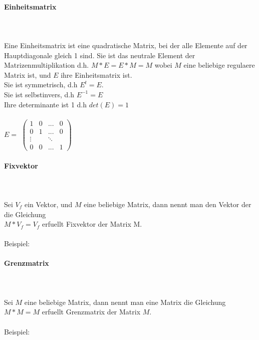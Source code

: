 \documentclass[a4paper]{article} %
\begin{document}
	\paragraph{Einheitsmatrix} 
	 \hspace{0 cm} \\ \noindent \\ Eine Einheitsmatrix ist eine quadratische Matrix, bei der alle Elemente auf der Hauptdiagonale gleich 1 sind.
	Sie ist das neutrale Element der Matrizenmultiplikation d.h. $M*E = E*M = M$ wobei $M$ eine beliebige regulaere Matrix ist, und $E$ ihre Einheitsmatrix ist.\\
	Sie ist symmetrisch, d.h $E^{t}=E$.\\
	Sie ist selbstinvers, d.h $E^{-1}=E$\\
	Ihre determinante ist 1 d.h $det(E)=1$\\\\
	$E =$
		$
		\begin{pmatrix}
		1 & 0 	& ... 	& 0\\
		0 & 1 	& ...	& 0\\
		\vdots  &     	& \ddots  \\
		0 & 0	& ...	& 1
		\end{pmatrix}
		$\\

	\newpage
	\paragraph{Fixvektor}
		\hspace{0 cm} \\ \noindent \\
	Sei  $V_f$ ein Vektor, und $M$ eine beliebige Matrix, dann nennt man den Vektor der die Gleichung \\	$M * V_f = V_f$ erfuellt Fixvektor der Matrix M.\\\\
	Beispiel:

	\paragraph{Grenzmatrix}
	 \hspace{0 cm} \\ \noindent \\
	Sei $M$ eine beliebige Matrix, dann nennt man eine Matrix die Gleichung $M * M = M$ erfuellt Grenzmatrix der Matrix $M$.
	\\\\
	Beispiel:
\end{document}
